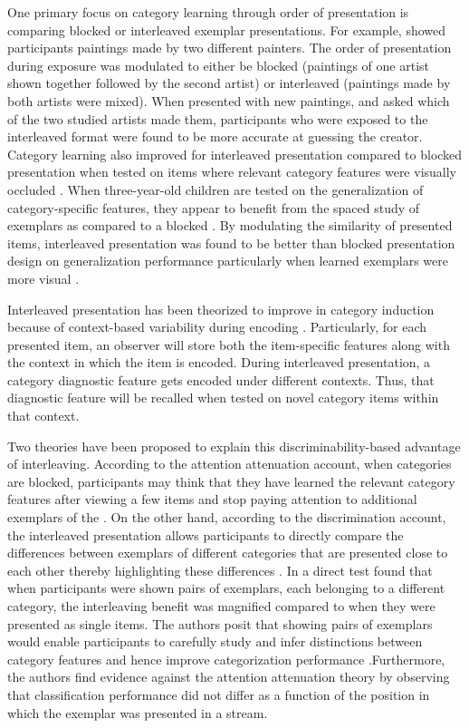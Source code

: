 One primary focus on category learning through order of presentation is comparing blocked or interleaved exemplar presentations. For example, \cite{kornell2008learning} showed participants paintings made by two different painters. The order of presentation during exposure was modulated to either be blocked (paintings of one artist shown together followed by the second artist) or interleaved (paintings made by both artists were mixed). When presented with new paintings, and asked which of the two studied artists made them, participants who were exposed to the interleaved format were found to be more accurate at guessing the creator. Category learning also improved for interleaved presentation compared to blocked presentation when tested on items where relevant category features were visually occluded \cite{whitehead2021transfer}. When three-year-old children are tested on the generalization of category-specific features, they appear to benefit from the spaced study of exemplars as compared to a blocked \cite{vlach2008spacing}. By modulating the similarity of presented items, interleaved presentation was found to be better than blocked presentation design on generalization performance particularly when learned exemplars were more visual \cite{kornell2008learning, carvalho2014putting}. 

Interleaved presentation has been theorized to improve in category induction because of context-based variability during encoding \cite{glenberg1979component}. Particularly, for each presented item, an observer will store both the item-specific features along with the context in which the item is encoded. During interleaved presentation, a category diagnostic feature gets encoded under different contexts. Thus, that diagnostic feature will be recalled when tested on novel category items within that context. 

Two theories have been proposed to explain this discriminability-based advantage of interleaving. According to the attention attenuation account, when categories are blocked, participants may think that they have learned the relevant category features after viewing a few items and stop paying attention to additional exemplars of the \cite{kornell2010spacing}. On the other hand, according to the discrimination account, the interleaved presentation allows participants to directly compare the differences between exemplars of different categories that are presented close to each other thereby highlighting these differences \cite{kornell2008learning}. In a direct test \cite{wahlheim2011spacing} found that when participants were shown pairs of exemplars, each belonging to a different category, the interleaving benefit was magnified compared to when they were presented as single items. The authors posit that showing pairs of exemplars would enable participants to carefully study and infer distinctions between category features and hence improve categorization performance .Furthermore, the authors find evidence against the attention attenuation theory by observing that classification performance did not differ as a function of the position in which the exemplar was presented in a stream.

